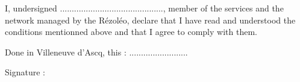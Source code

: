 \documentclass[10pt]{article}
\begin{document}
\vspace*{0.5cm}

I, undersigned ............................................, member of the services and the network managed by the
Rézoléo, declare that I have read and understood the conditions mentionned above and that I agree to comply
with them.

\vspace*{0.5cm}

\hspace{8.5cm} Done in Villeneuve d’Ascq, this : ......................... 


\hspace{8.5cm} Signature :

\end{document}
